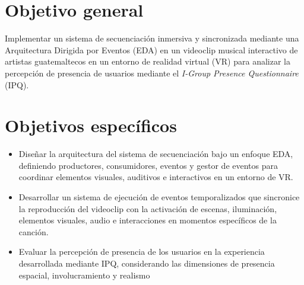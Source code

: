 \section{Objetivo general}
Implementar un sistema de secuenciación inmersiva y sincronizada mediante una Arquitectura Dirigida por Eventos (EDA) en un videoclip musical interactivo de artistas guatemaltecos en un entorno de realidad virtual (VR) para analizar la percepción de presencia de usuarios mediante el \emph{I-Group Presence Questionnaire} (IPQ).

\section{Objetivos específicos}
\begin{itemize}
\item Diseñar la arquitectura del sistema de secuenciación bajo un enfoque EDA, definiendo productores, consumidores, eventos y gestor de eventos para coordinar elementos visuales, auditivos e interactivos en un entorno de VR.
\item Desarrollar un sistema de ejecución de eventos temporalizados que sincronice la reproducción del videoclip con la activación de escenas, iluminación, elementos visuales, audio e interacciones en momentos específicos de la canción.
\item Evaluar la percepción de presencia de los usuarios en la experiencia desarrollada mediante IPQ, considerando las dimensiones de presencia espacial, involucramiento y realismo

\end{itemize}